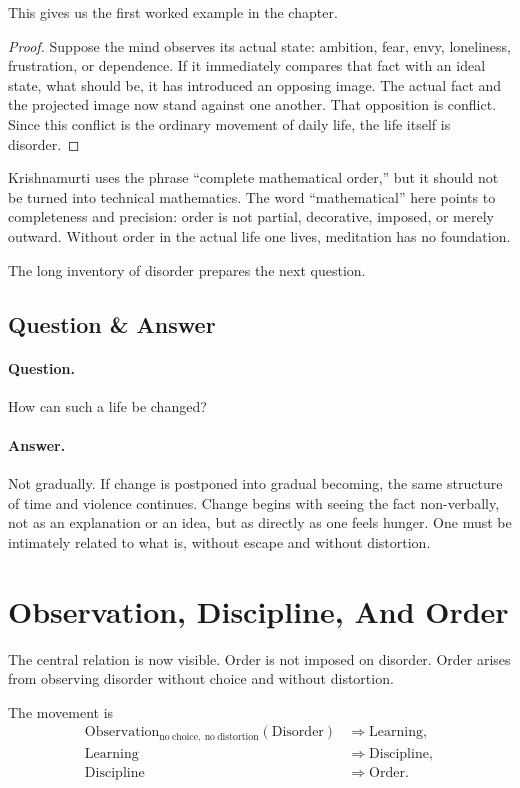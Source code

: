 This gives us the first worked example in the chapter.

\begin{proof}
Suppose the mind observes its actual state: ambition, fear, envy, loneliness, frustration, or dependence. If it immediately compares that fact with an ideal state, what should be, it has introduced an opposing image. The actual fact and the projected image now stand against one another. That opposition is conflict. Since this conflict is the ordinary movement of daily life, the life itself is disorder.
\end{proof}

Krishnamurti uses the phrase ``complete mathematical order,'' but it should not be turned into technical mathematics. The word ``mathematical'' here points to completeness and precision: order is not partial, decorative, imposed, or merely outward. Without order in the actual life one lives, meditation has no foundation.

The long inventory of disorder prepares the next question.

\subsection{Question \& Answer}

\paragraph{Question.}
How can such a life be changed?

\paragraph{Answer.}
Not gradually. If change is postponed into gradual becoming, the same structure of time and violence continues. Change begins with seeing the fact non-verbally, not as an explanation or an idea, but as directly as one feels hunger. One must be intimately related to what is, without escape and without distortion.

\section{Observation, Discipline, And Order}

The central relation is now visible. Order is not imposed on disorder. Order arises from observing disorder without choice and without distortion.

The movement is
\begin{align}
\mathrm{Observation}_{\mathrm{no\ choice,\ no\ distortion}}(\mathrm{Disorder})
&\Rightarrow \mathrm{Learning}, \\
\mathrm{Learning}
&\Rightarrow \mathrm{Discipline}, \\
\mathrm{Discipline}
&\Rightarrow \mathrm{Order}.
\end{align}

